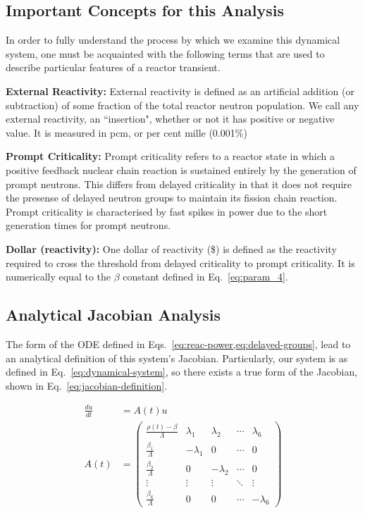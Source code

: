 \documentclass[review,onefignum,onetabnum]{siamart171218}
\begin{document}
\subsection{Important Concepts for this Analysis}
In order to fully understand the process by which we examine this dynamical system,
one must be acquainted with the following terms that are used to describe particular
features of a reactor transient.
\begin{definition}{\textbf{External Reactivity:}}
  External reactivity is defined as an artificial addition (or subtraction) of
  some fraction of the total reactor neutron population. We call any external reactivity,
  an ``insertion", whether or not it has positive or negative value. It is measured in pcm,
  or per cent mille (0.001\%)
\end{definition}
\begin{definition}{\textbf{Prompt Criticality:}}
  Prompt criticality refers to a reactor state in which a positive feedback nuclear
  chain reaction is sustained entirely by the generation of prompt neutrons.
  This differs from delayed criticality in that it does not require the presense of
  delayed neutron groups to maintain its fission chain reaction. Prompt criticality
  is characterised by fast spikes in power due to the short generation times for
  prompt neutrons.
\end{definition}
\begin{definition}{\textbf{Dollar (reactivity):}}
  One dollar of reactivity (\$) is defined as the reactivity required to cross the
  threshold from delayed criticality to prompt criticality. It is numerically equal
  to the $\beta$ constant defined in Eq.~\cref{eq:param_4}.
\end{definition}


\subsection{Analytical Jacobian Analysis}
The form of the ODE defined in Eqs.~\cref{eq:reac-power,eq:delayed-groups},
lead to an analytical definition of this system's Jacobian.\cite{Ganopol_accurate}
Particularly, our system is as defined in Eq.~\cref{eq:dynamical-system}, so
there exists a true form of the Jacobian, shown in Eq.~\cref{eq:jacobian-definition}.

\begin{align}
  \label{eq:dynamical-system}
  \frac{du}{dt} &= A(t)u\\
  \label{eq:jacobian-definition}
  A(t) &= \begin{pmatrix}\frac{\rho(t)-\beta}{\Lambda}&\lambda_1&\lambda_2&\cdots&\lambda_6\\
                      \frac{\beta_1}{\Lambda}&-\lambda_1&0&\cdots&0\\
                      \frac{\beta_2}{\Lambda}&0&-\lambda_2&\cdots&0\\
                      \vdots&\vdots&\vdots&\ddots&\vdots\\
                      \frac{\beta_6}{\Lambda}&0&0&\cdots&-\lambda_6\end{pmatrix}
\end{align}
\end{document}
